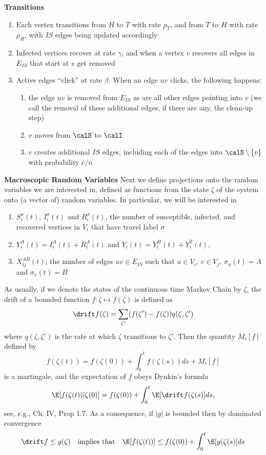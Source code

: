 \documentclass[11pt]{article}
\begin{document}
\noindent\textbf{Transitions}
\begin{enumerate}
    \item Each vertex transitions from $H$ to $T$ with rate $\rho_T$, and from $T$ to $H$ with rate $\rho_H$, with $IS$ edges being updated accordingly
    \item Infected vertices recover at rate $\gamma$, and when a vertex $v$ recovers all edges in $E_{IS}$ that start at $v$ get removed
    \item Active edges ``click'' at rate $\beta$.  When an edge $uv$ clicks, the following happens:
    \begin{enumerate}
        \item the  edge $uv$ is removed from $E_{IS}$ as are all other edges pointing into $v$ (we call the removal of these additional edges, if there are any, the clean-up step)
        \item $v$ moves from $\calS$ to $\calI$
        \item $v$ creates additional $IS$ edges, including each of the edges into $\calS\setminus\{v\}$ with probability $c/n$
    \end{enumerate}
\end{enumerate}

\medskip

\noindent\textbf{Macroscopic Random Variables}
Next we define projections onto the random variables we are interested in, defined as functions from the state $\zeta$ of the system onto (a vector of) random variables.  In particular, we will be interested in
\begin{enumerate}
    \item $S_i^\sigma(t)$, $I_i^\sigma(t)$ and $R_i^\sigma(t)$, the number of susceptible, infected, and recovered vertices in $V_i$ that have travel label $\sigma$
    \item $
    Y_i^A(t)=I_i^A(t)+R_i^A(t)$ and $Y_i(t)=Y_i^H(t)+Y_i^T(t)$,
    \item $X_{ij}^{AB}(t)$, the number of edges $uv\in E_{IS}$ such that $u\in V_i$, $v\in V_j$, $\sigma_u(t)=A$ and $\sigma_v(t)=B$
\end{enumerate}
As usually, if we denote the states of the continuous time Markov Chain by $\zeta$, the drift of a bounded function $f:\zeta\mapsto f(\zeta)$ is defined as
$$
\drift f (\zeta) =\sum_{\zeta'} (f(\zeta')-f(\zeta))q(\zeta,\zeta')$$
where $q(\zeta,\zeta')$ is the rate at which $\zeta$ transitions to $\zeta'$.  Then the quantity $M_t[f]$ defined by 
$$
f(\zeta(t))=f(\zeta(0))+\int_0^t f(\zeta(s))ds +M_t[f]
$$
is a martingale, and the expectation of $f$ obeys Dynkin's formula
$$
\E [f(\zeta(t))|\zeta(0)] = f(\zeta(0)) + \int_0^t \E[\drift f(\zeta(s)]ds,
$$
see, e.g., \cite{EthierKurtz1986} Ch. IV, Prop 1.7.  As a consequence, if $|g|$ is bounded then by dominated convergence
\begin{equation}
    \drift f\leq g(\zeta)\quad\text{implies that}\quad
    \E[f(\zeta(t))]\leq f(\zeta(0))+\int_0^t \E[g(\zeta(s)]ds
\end{equation}
\end{document}
